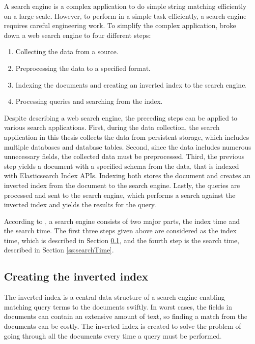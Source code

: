 A search engine is a complex application to do simple string matching efficiently
on a large-scale.
However, to perform in a simple task efficiently, a search engine requires careful 
engineering work.
To simplify the complex application,
\citeauthor{ganSuel} \cite{ganSuel} broke down a web search engine 
to four different steps:
\begin{enumerate}
    \item Collecting the data from a source.
    \item Preprocessing the data to a specified format.
    \item Indexing the documents and creating an inverted index to the search engine.
    \item Processing queries and searching from the index.
\end{enumerate}

Despite describing a web search engine, the preceding steps can be applied to various 
search applications. 
First, during the data collection, the search application in this thesis 
collects the data from persistent storage, which includes multiple databases and database tables.
Second, since the data includes numerous unnecessary fields, the collected data must be preprocessed.
Third, the previous step yields a document with a specified schema from the data, 
that is indexed with Elasticsearch Index APIs.
Indexing both stores the document and creates an inverted index from the document to the search engine.
Lastly, the queries are processed and sent to the search engine, which
performs a search against the inverted index and yields the results for the query.


According to \citeauthor{relevantSearch} \cite{relevantSearch},
a search engine consists of two major parts, the index time and the search time. 
The first three steps given above are considered as the index time, which is described in Section \ref{ss:invertedIndex},
and the fourth step is the search time, described in Section \ref{ss:searchTime}.

\subsection{Creating the inverted index}
\label{ss:invertedIndex}

The inverted index is a central data structure of a search engine enabling 
matching query terms to the documents swiftly.
In worst cases, the fields in documents can contain an extensive amount of text, so 
finding a match from the documents can be costly.
The inverted index is created to solve the problem of going through all the documents 
every time a query must be performed. \cite{relevantSearch}


